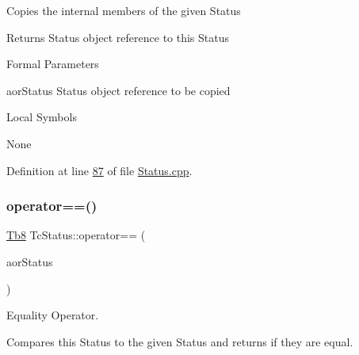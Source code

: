 Copies the internal members of the given Status

\begin{DoxyReturn}{Returns}
Status object reference to this Status
\end{DoxyReturn}
\begin{DoxyParagraph}{Formal Parameters}

\begin{DoxyPre}{\ttfamily [ in ]  aorStatus    Status object reference to be copied }\end{DoxyPre}

\end{DoxyParagraph}
\begin{DoxyParagraph}{Local Symbols}

\begin{DoxyPre}{\ttfamily  None }\end{DoxyPre}
 
\end{DoxyParagraph}


Definition at line \mbox{\hyperlink{_status_8cpp_source_l00087}{87}} of file \mbox{\hyperlink{_status_8cpp_source}{Status.\+cpp}}.

\mbox{\label{class_g_n_common_1_1_n_notification_1_1_tc_status_acf4e836982c2da53ad1e6989af623c58}} 
\subsubsection{\texorpdfstring{operator==()}{operator==()}}
{\footnotesize\ttfamily \mbox{\hyperlink{namespace_g_n_common_a8115dc7ed53b6e5b52e6bfde1632ea74}{Tb8}} Tc\+Status\+::operator== (\begin{DoxyParamCaption}\item[{const \mbox{\hyperlink{class_g_n_common_1_1_n_notification_1_1_tc_status}{Tc\+Status}} \&}]{aor\+Status }\end{DoxyParamCaption})}



Equality Operator. 

Compares this Status to the given Status and returns if they are equal.

